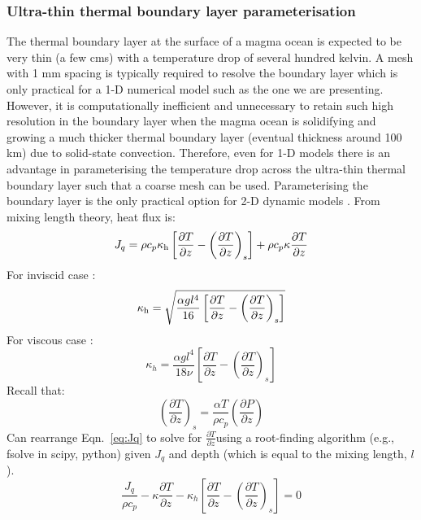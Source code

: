 \subsubsection{Ultra-thin thermal boundary layer parameterisation}
The thermal boundary layer at the surface of a magma ocean is expected to be very thin (a few cms) with a temperature drop of several hundred kelvin.  A mesh with 1 mm spacing is typically required to resolve the boundary layer which is only practical for a 1-D numerical model such as the one we are presenting.  However, it is computationally inefficient and unnecessary to retain such high resolution in the boundary layer when the magma ocean is solidifying and growing a much thicker thermal boundary layer (eventual thickness around 100 km) due to solid-state convection.  Therefore, even for 1-D models there is an advantage in parameterising the temperature drop across the ultra-thin thermal boundary layer such that a coarse mesh can be used.  Parameterising the boundary layer is the only practical option for 2-D dynamic models \citep[e.g.,][]{LT16}.  From mixing length theory, heat flux is:
\begin{equation}
J_q = \rho c_p \kappa_{\rm h} \left[ \frac{\partial T}{\partial z}-\left( \frac{\partial T}{\partial z} \right)_s \right] + \rho c_p \kappa \frac{\partial T}{\partial z}
\label{eq:Jq}
\end{equation}
For inviscid case \citep{ABE93}:
\begin{equation}
\kappa_{\rm h} = \sqrt{\frac{\alpha g l^4}{16} \left[ \frac{\partial T}{\partial z}-\left( \frac{\partial T}{\partial z} \right)_s \right] }
\label{eq:kappah_invisc}
\end{equation}
For viscous case \citep{ABE93}:
\begin{equation}
\kappa_h = \frac{\alpha g l^4}{18 \nu} \left[ \frac{\partial T}{\partial z}-\left( \frac{\partial T}{\partial z} \right)_s \right]
\label{eq:kappah_viscous}
\end{equation}
Recall that:
\begin{equation}
\left( \frac{\partial T}{\partial z} \right)_s = \frac{\alpha T}{\rho c_p} \left( \frac{\partial P}{\partial z} \right)
\end{equation}
Can rearrange Eqn.~\ref{eq:Jq} to solve for $\frac{\partial T}{\partial z}$using a root-finding algorithm (e.g., fsolve in scipy, python) given $J_q$ and depth (which is equal to the mixing length, $l$).
\begin{equation}
\label{eq:nonlinear}
\frac{J_q}{\rho c_p} - \kappa \frac{\partial T}{\partial z} - \kappa_h \left[ \frac{\partial T}{\partial z} - \left( \frac{\partial T}{\partial z} \right)_s \right] = 0
\end{equation}
